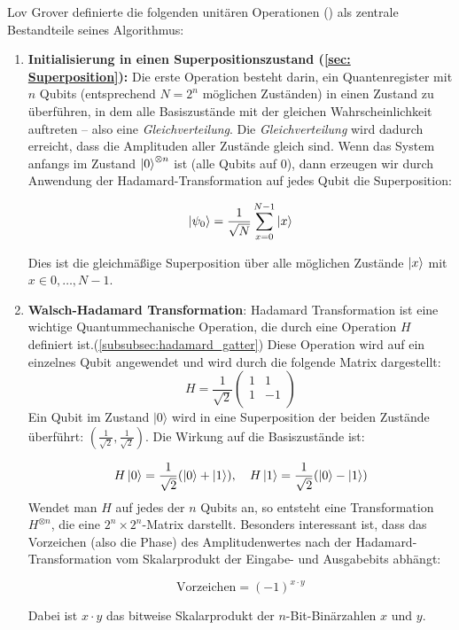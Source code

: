 Lov Grover definierte die folgenden unitären Operationen (\cite{zotero-1211}) als zentrale Bestandteile seines Algorithmus:

\begin{enumerate}
    \item \textbf{Initialisierung in einen Superpositionszustand (\ref{sec: Superposition}):} 
    Die erste Operation besteht darin, ein Quantenregister mit $n$ Qubits (entsprechend $N = 2^{n}$ möglichen Zuständen) in einen Zustand zu überführen, in dem alle Basiszustände mit der gleichen Wahrscheinlichkeit auftreten – also eine \textit{Gleichverteilung}. Die \textit{Gleichverteilung} wird dadurch erreicht, dass die Amplituden aller Zustände gleich sind. Wenn das System anfangs im Zustand $\ket{0}^{\otimes n}$ ist (alle Qubits auf 0), dann erzeugen wir durch Anwendung der Hadamard-Transformation auf jedes Qubit die Superposition:

$$
\ket{\psi_0} = \frac{1}{\sqrt{N}} \sum_{x=0}^{N-1} \ket{x}
$$

Dies ist die gleichmäßige Superposition über alle möglichen Zustände $\ket{x}$ mit $x \in {0, \ldots, N-1}$.\\
    \item \textbf{Walsch-Hadamard Transformation}: Hadamard Transformation ist eine wichtige Quantummechanische Operation, die durch eine Operation $H$ definiert ist.(\ref{subsubsec:hadamard_gatter}) Diese Operation wird auf ein einzelnes Qubit angewendet und wird durch die folgende Matrix dargestellt:
    $$
H = \frac{1}{\sqrt{2}} \begin{pmatrix}
1 & 1 \\
1 & -1 \\
\end{pmatrix}
$$
Ein Qubit im Zustand \( \lvert 0 \rangle \) wird in eine Superposition der beiden Zustände überführt: \( \left( \frac{1}{\sqrt{2}}, \frac{1}{\sqrt{2}} \right) \). Die Wirkung auf die Basiszustände ist:

$$
H\ket{0} = \frac{1}{\sqrt{2}}(\ket{0} + \ket{1}), \quad H\ket{1} = \frac{1}{\sqrt{2}}(\ket{0} - \ket{1})
$$
Wendet man $H$ auf jedes der $n$ Qubits an, so entsteht eine Transformation $H^{\otimes n}$, die eine $2^n \times 2^n$-Matrix darstellt.
Besonders interessant ist, dass das Vorzeichen (also die Phase) des Amplitudenwertes nach der Hadamard-Transformation vom Skalarprodukt der Eingabe- und Ausgabebits abhängt:

$$
\text{Vorzeichen} = (-1)^{x \cdot y}
$$

Dabei ist $x \cdot y$ das bitweise Skalarprodukt der $n$-Bit-Binärzahlen $x$ und $y$.\\


\end{enumerate}
